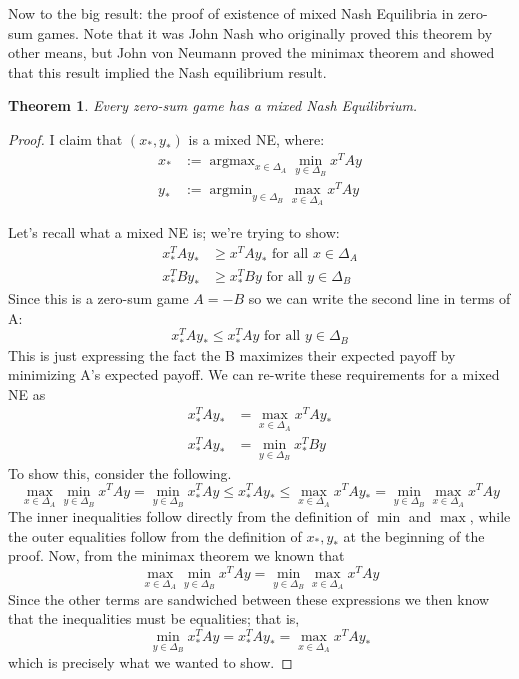 \documentclass[12pt]{article}
\DeclareMathOperator*{\argmax}{argmax}
\DeclareMathOperator*{\argmin}{argmin}
\newtheorem{thm}{Theorem}
\begin{document}
Now to the big result: the proof of existence of mixed Nash Equilibria in zero-sum games. Note that it was John Nash who originally proved this theorem by other means, but John von Neumann
proved the minimax theorem and showed that this result implied the Nash equilibrium result. 

\begin{thm}
Every zero-sum game has a mixed Nash Equilibrium. 
\end{thm}

\begin{proof}
I claim that $(x_*, y_*)$ is a mixed NE, where:
\begin{align*}
x_* &:= \argmax_{x \in \Delta_A} \min_{y \in \Delta_B} x^T A y \\
y_* &:= \argmin_{y \in \Delta_B} \max_{x \in \Delta_A} x^T A y
\end{align*}

Let's recall what a mixed NE is; we're trying to show: 
\begin{align*}
x_*^T A y_* &\geq x^T A y_* \text{ for all }  x \in \Delta_A \\
x_*^T B y_* &\geq x_*^T B y \text{ for all } y \in \Delta_B 
\end{align*}
Since this is a zero-sum game $A = -B$ so we can write the second line in terms of A: 
\[x_*^T A y_* \leq x_*^T A y \text{ for all } y \in \Delta_B \]
This is just expressing the fact the B maximizes their expected payoff by minimizing A's expected payoff. We can re-write these requirements for a mixed NE as
\begin{align*}
x_*^T A y_* &= \max_{x \in \Delta_A} x^T A y_* \\
x_*^T A y_* &= \min_{y \in \Delta_B} x_*^T B y 
\end{align*}
To show this, consider the following. 
\[\max_{x \in \Delta_A} \min_{y \in \Delta_B} x^T A y = \min_{y \in \Delta_B} x_*^T A y \leq x_*^T A y_* \leq \max_{x \in \Delta_A} x^T A y_* = \min_{y \in \Delta_B} \max_{x \in \Delta_A} x^T A y \]
The inner inequalities follow directly from the definition of $\min$ and $\max$, while the outer equalities follow from the definition of $x_*, y_*$ at the beginning of the proof. Now, from the minimax 
theorem we known that 
\[\max_{x \in \Delta_A} \min_{y \in \Delta_B} x^T A y = \min_{y \in \Delta_B} \max_{x \in \Delta_A} x^T A y \]
Since the other terms are sandwiched between these expressions we then know that the inequalities must be equalities; that is, 
\[\min_{y \in \Delta_B} x_*^T A y = x_*^T A y_* = \max_{x \in \Delta_A} x^T A y_*\]
which is precisely what we wanted to show. 
\end{proof}
\end{document}
